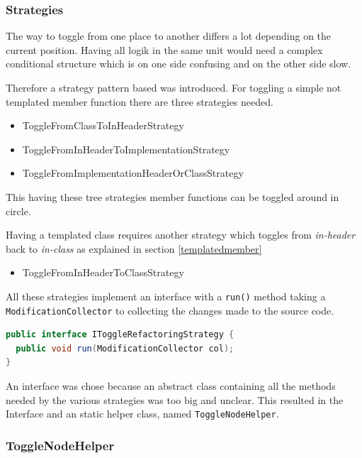 \subsubsection{Strategies}

The way to toggle from one place to another differs a lot depending on
the current position. Having all logik in the same unit would need a complex
conditional structure which is on one side confusing and on the other side
slow.

Therefore a strategy pattern based was introduced. For toggling a simple not
templated member function there are three strategies needed. 

\begin{itemize}
\item ToggleFromClassToInHeaderStrategy
\item ToggleFromInHeaderToImplementationStrategy
\item ToggleFromImplementationHeaderOrClassStrategy
\end{itemize}

This having these tree strategies member functions can be
toggled around in circle.\newline

Having a templated class requires another strategy which toggles from
\textit{in-header} back to \textit{in-class} as explained in section
\ref{templatedmember}

\begin{itemize}
\item ToggleFromInHeaderToClassStrategy
\end{itemize}

All these strategies implement an interface with a \texttt{run()} method taking
a \texttt{ModificationCollector} to collecting the changes made to the source
code.

\begin{lstlisting}[caption={IToggleRefactoringStrategy},
label={01templatedMember}, language=Java]
public interface IToggleRefactoringStrategy {
  public void run(ModificationCollector col);
}
\end{lstlisting}

An interface was chose because an abstract class containing all the methods
needed by the various strategies was too big and unclear. This resulted in the
Interface and an static helper class, named \texttt{ToggleNodeHelper}.

\subsubsection{ToggleNodeHelper}

